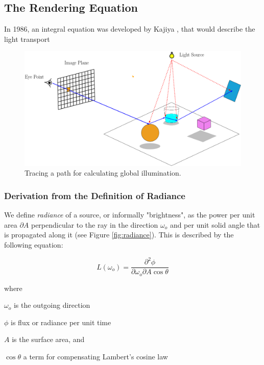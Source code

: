 
\subsection{The Rendering Equation}

In 1986, an integral equation was developed by Kajiya \cite{kajiya1986rendering}, that would describe the light transport

\begin{figure}
	\centering
	\includegraphics[width=1\linewidth]{img/1 fundamentals/path_tracing.png}
	\caption{Tracing a path for calculating global illumination.}
	\label{fig:pathtracing}
\end{figure}

\subsubsection{Derivation from the Definition of Radiance}

We define \emph{radiance} of a source, or informally "brightness", as the power per unit area $\partial A$ perpendicular to the ray in the direction $\omega_{o}$ and per unit solid angle that is propagated along it (see Figure \ref{fig:radiance}). This is described by the following equation:

\begin{equation}
L(\omega_{o}) = \frac{\partial^2\phi}{\partial\omega_{o}\partial A\cos\theta}
\end{equation}

\noindent where
\begin{description}
	\setlength\itemsep{0.05em}
	\item  $\omega_{o}$ is the outgoing direction
	\item  $\phi$ is flux or radiance per unit time
	\item  $A$ is the surface area, and
	\item  $\cos\theta$ a term for compensating Lambert's cosine law
\end{description}



